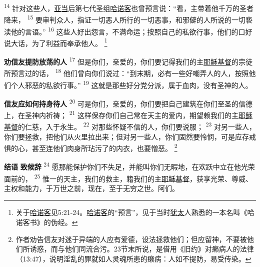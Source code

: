 \textsuperscript{14}
针对这些人，\uline{亚当}后第七代圣组\uline{哈诺客}也曾预言说：“看，主带着他千万的圣者降来，
\textsuperscript{15}
要审判众人，指证一切恶人所行的一切恶事，和邪僻的人所说的一切亵渎他的言语。”
\textsuperscript{16}
这些人好出怨言，不满命运；按照自己的私欲行事，他们的口好说大话，为了利益而奉承他人。
\footnote{关于\uline{哈诺客}见5:21-24。\uline{哈诺客}的“预言”，见于当时\uline{犹太}人熟悉的一本名叫《哈诺客书》的伪经。}

\textbf{劝信友提防放荡的人 }
\textsuperscript{17}
但是你们，亲爱的，你们要记得我们的主\uline{耶稣}\uline{基督}的宗徒所预言过的话，
\textsuperscript{18}
他们曾向你们说过：“到末期，必有一些好嘲弄人的人，按照他们个人邪恶的私欲行事。”
\textsuperscript{19}
这就是那些好分党分派，属于血肉，没有圣神的人。

\textbf{信友应如何持身待人 }
\textsuperscript{20}
可是你们，亲爱的，你们要把自己建筑在你们至圣的信德上，在圣神内祈祷；
\textsuperscript{21}
这样保存你们自己常在天主的爱内，期望赖我们的主\uline{耶稣}\uline{基督}的仁慈，入于永生。
\textsuperscript{22}
对那些怀疑不信的人，你们要说服；
\textsuperscript{23}
对另一些人，你们要拯救，把他们从火里拉出来；但对另一些人，你们固然要怜悯，可是应存戒惧的心，甚至连他们肉身所玷污了的内衣，也要憎恶。
\footnote{作者劝告信友对迷于异端的人应有爱德，设法拯救他们；但应留神，不要被他们所诱惑，而与他们同流合污。23节末所说，是借用《旧约》对癞病人的法律（13:47），说明淫乱的罪就如人灵魂所患的癞病：人如不提防，易受传染。}

\textbf{结语 }
\textbf{致候辞 }
\textsuperscript{24}
愿那能保护你们不失足，并能叫你们无暇地，在欢跃中立在他光荣面前的，
\textsuperscript{25}
惟一的天主，我们的救主，籍我们的主\uline{耶稣}\uline{基督}，获享光荣、尊威、主权和能力，于万世之前，现在，至于无穷之世。阿们。
